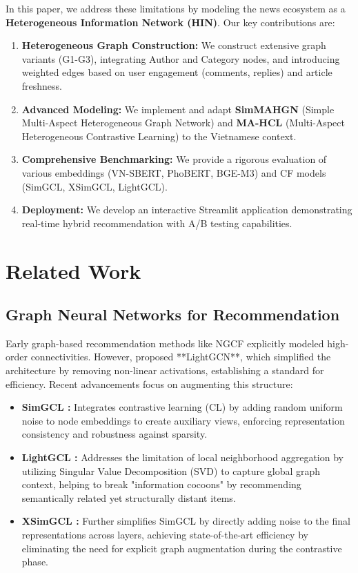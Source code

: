 \documentclass[11pt]{article}
\begin{document}
In this paper, we address these limitations by modeling the news ecosystem as a \textbf{Heterogeneous Information Network (HIN)}. Our key contributions are:
\begin{enumerate}
  \item \textbf{Heterogeneous Graph Construction:} We construct extensive graph variants (G1-G3), integrating Author and Category nodes, and introducing weighted edges based on user engagement (comments, replies) and article freshness.
  \item \textbf{Advanced Modeling:} We implement and adapt \textbf{SimMAHGN} (Simple Multi-Aspect Heterogeneous Graph Network) and \textbf{MA-HCL} (Multi-Aspect Heterogeneous Contrastive Learning) to the Vietnamese context.
  \item \textbf{Comprehensive Benchmarking:} We provide a rigorous evaluation of various embeddings (VN-SBERT, PhoBERT, BGE-M3) and CF models (SimGCL, XSimGCL, LightGCL).
  \item \textbf{Deployment:} We develop an interactive Streamlit application demonstrating real-time hybrid recommendation with A/B testing capabilities.
\end{enumerate}

\section{Related Work}

\subsection{Graph Neural Networks for Recommendation}
Early graph-based recommendation methods like NGCF \citet{wang2019neural} explicitly modeled high-order connectivities. However, \citet{he2020lightgcn} proposed **LightGCN**, which simplified the architecture by removing non-linear activations, establishing a standard for efficiency. Recent advancements focus on augmenting this structure:
\begin{itemize}
  \item \textbf{SimGCL \citet{yu2022graph}:} Integrates contrastive learning (CL) by adding random uniform noise to node embeddings to create auxiliary views, enforcing representation consistency and robustness against sparsity.
  \item \textbf{LightGCL \citet{cai2023lightgcl}:} Addresses the limitation of local neighborhood aggregation by utilizing Singular Value Decomposition (SVD) to capture global graph context, helping to break "information cocoons" by recommending semantically related yet structurally distant items.
  \item \textbf{XSimGCL \citet{yu2023xsimgcl}:} Further simplifies SimGCL by directly adding noise to the final representations across layers, achieving state-of-the-art efficiency by eliminating the need for explicit graph augmentation during the contrastive phase.
\end{itemize}
\end{document}
